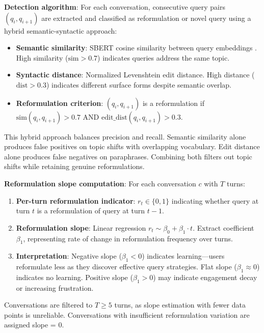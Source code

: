 \textbf{Detection algorithm}: For each conversation, consecutive query pairs $(q_i, q_{i+1})$ are extracted and classified as reformulation or novel query using a hybrid semantic-syntactic approach:

\begin{itemize}
\item \textbf{Semantic similarity}: SBERT cosine similarity between query embeddings \citep{reimers2019sentence}. High similarity ($\text{sim} > 0.7$) indicates queries address the same topic.
\item \textbf{Syntactic distance}: Normalized Levenshtein edit distance. High distance ($\text{dist} > 0.3$) indicates different surface forms despite semantic overlap.
\item \textbf{Reformulation criterion}: $(q_i, q_{i+1})$ is a reformulation if $\text{sim}(q_i, q_{i+1}) > 0.7$ AND $\text{edit\_dist}(q_i, q_{i+1}) > 0.3$.
\end{itemize}

This hybrid approach balances precision and recall. Semantic similarity alone produces false positives on topic shifts with overlapping vocabulary. Edit distance alone produces false negatives on paraphrases. Combining both filters out topic shifts while retaining genuine reformulations.

\textbf{Reformulation slope computation}: For each conversation $c$ with $T$ turns:

\begin{enumerate}
\item \textbf{Per-turn reformulation indicator}: $r_t \in \{0, 1\}$ indicating whether query at turn $t$ is a reformulation of query at turn $t-1$.
\item \textbf{Reformulation slope}: Linear regression $r_t \sim \beta_0 + \beta_1 \cdot t$. Extract coefficient $\beta_1$, representing rate of change in reformulation frequency over turns.
\item \textbf{Interpretation}: Negative slope ($\beta_1 < 0$) indicates learning---users reformulate less as they discover effective query strategies. Flat slope ($\beta_1 \approx 0$) indicates no learning. Positive slope ($\beta_1 > 0$) may indicate engagement decay or increasing frustration.
\end{enumerate}

Conversations are filtered to $T \geq 5$ turns, as slope estimation with fewer data points is unreliable. Conversations with insufficient reformulation variation are assigned slope = 0.

